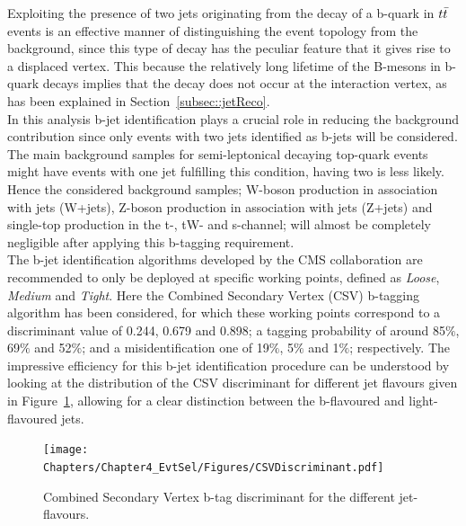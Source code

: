 Exploiting the presence of two jets originating from the decay of a b-quark in $t\bar{t}$ events is an effective manner of distinguishing the event topology from the background, since this type of decay has the peculiar feature that it gives rise to a displaced vertex. This because the relatively long lifetime of the B-mesons in b-quark decays implies that the decay does not occur at the interaction vertex, as has been explained in Section~\ref{subsec::jetReco}.
\\ 
In this analysis b-jet identification plays a crucial role in reducing the background contribution since only events with two jets identified as b-jets will be considered. The main background samples for semi-leptonical decaying top-quark events might have events with one jet fulfilling this condition, having two  is less likely. %
Hence the considered background samples; W-boson production in association with jets (W+jets), Z-boson production in association with jets (Z+jets) and single-top production in the t-, tW- and s-channel; will almost be completely negligible after applying this b-tagging requirement.
\\

The b-jet identification algorithms developed by the CMS collaboration are recommended to only be deployed at specific working points, defined as \textit{Loose}, \textit{Medium} and \textit{Tight}. 
Here the Combined Secondary Vertex (CSV) b-tagging algorithm has been considered, for which these working points correspond to a discriminant value of 0.244, 0.679 and 0.898; a tagging probability of around 85$\%$, 69$\%$ and 52$\%$; and a misidentification one of 19$\%$, 5$\%$ and 1$\%$; respectively.
The impressive efficiency for this b-jet identification procedure can be understood by looking at the distribution of the CSV discriminant for different jet flavours given in Figure~\ref{fig::CSVDiscr}, allowing for a clear distinction between the b-flavoured and light-flavoured jets.
\begin{figure}[h!t]
 \centering
 \texttt{[image: Chapters/Chapter4\_EvtSel/Figures/CSVDiscriminant.pdf]}
 \caption{Combined Secondary Vertex b-tag discriminant for the different jet-flavours.} \label{fig::CSVDiscr}
\end{figure}

